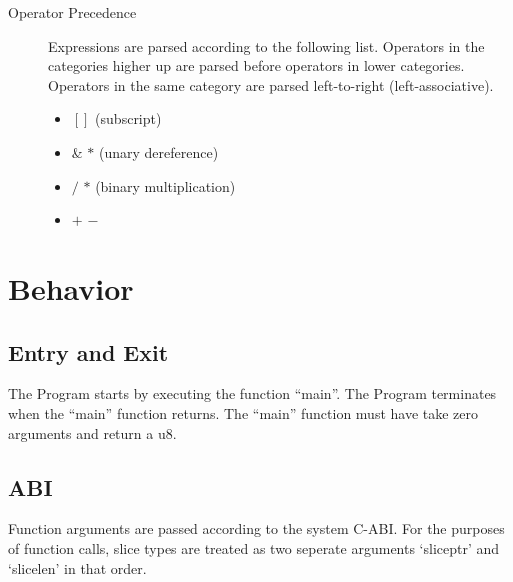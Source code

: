 \documentclass{article}
\begin{document}
\begin{description}
\begin{description}
		\end{description}
	\item[Operator Precedence]
		Expressions are parsed according to the following list. Operators in the categories higher up are parsed before operators in lower categories.
		Operators in the same category are parsed left-to-right (left-associative).
		\begin{itemize}
		\item $[]$ (subscript)
		\item \& $*$ (unary dereference)
		\item $/$ $*$ (binary multiplication)
		\item $+$ $-$
		\end{itemize}
	\end{description}

\section{Behavior}
	\subsection{Entry and Exit} The Program starts by executing the function ``main''. The Program terminates when the ``main'' function returns.
		The ``main'' function must have take zero arguments and return a u8.
	\subsection{ABI} Function arguments are passed according to the system C-ABI.
		For the purposes of function calls, slice types are treated as two seperate arguments `sliceptr' and `slicelen' in that order.
\end{document}
